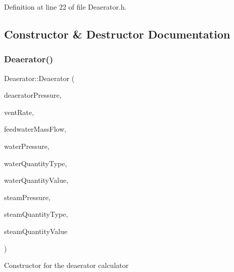 Definition at line 22 of file Deaerator.\+h.



\subsection{Constructor \& Destructor Documentation}
\mbox{\label{class_deaerator_a02311c34cbe46384187292e5f844984c}} 
\subsubsection{\texorpdfstring{Deaerator()}{Deaerator()}\hspace{0.1cm}{\footnotesize\ttfamily [1/3]}}
{\footnotesize\ttfamily Deaerator\+::\+Deaerator (\begin{DoxyParamCaption}\item[{double}]{deaerator\+Pressure,  }\item[{double}]{vent\+Rate,  }\item[{double}]{feedwater\+Mass\+Flow,  }\item[{double}]{water\+Pressure,  }\item[{\hyperlink{class_steam_properties_ae0294bedf7d178c2d8fb6aed0f62fbff}{Steam\+Properties\+::\+Thermodynamic\+Quantity}}]{water\+Quantity\+Type,  }\item[{double}]{water\+Quantity\+Value,  }\item[{double}]{steam\+Pressure,  }\item[{\hyperlink{class_steam_properties_ae0294bedf7d178c2d8fb6aed0f62fbff}{Steam\+Properties\+::\+Thermodynamic\+Quantity}}]{steam\+Quantity\+Type,  }\item[{double}]{steam\+Quantity\+Value }\end{DoxyParamCaption})}

Constructor for the deaerator calculator


